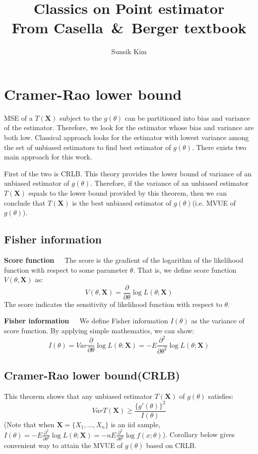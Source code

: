 \documentclass[10pt]{article}
\title{%
Classics on Point estimator \\
\large{From Casella\ \&\ Berger textbook}}
\author{Sunsik Kim}
\date{}
\begin{document}
\maketitle

\section{Cramer-Rao lower bound}
MSE of a $T(\textbf{X})$ subject to the $g(\theta)$ can be partitioned into bias and variance of the estimator. Therefore, we look for the estimator whose bias and variance are both low. Classical approach looks for the estimator with lowest variance among the set of unbiased estimators to find best estimator of $g(\theta)$. There exists two main approach for this work. 

\noindent First of the two is CRLB. This theory provides the lower bound of variance of an unbiased estimator of $g(\theta)$. Therefore, if the variance of an unbiased estimator $T(\textbf{X})$ equals to the lower bound provided  by this theorem, then we can conclude that $T(\textbf{X})$ is the best unbiased estimator of $g(\theta)$(i.e. MVUE of $g(\theta)$).

\subsection{Fisher information}
\textbf{Score function}\ \ \ The score is the gradient of the logarithm of the likelihood function with respect to some parameter $\theta$. That is, we define score function $V(\theta, \textbf{X})$ as:
$$
V(\theta, \textbf{X})=\displaystyle\frac{\partial}{\partial\theta}\log L(\theta;\textbf{X})
$$
The score indicates the sensitivity of likelihood function with respect to $\theta$.\bigskip

\noindent \textbf{Fisher information}\ \ \ We define Fisher information $I(\theta)$ as the variance of score function. By applying simple mathematics, we can show:
$$
I(\theta)=Var\displaystyle\frac{\partial}{\partial\theta}\log L(\theta;\textbf{X})=-E\displaystyle\frac{\partial^2}{\partial\theta^2}\log L(\theta;\textbf{X})
$$

\subsection{Cramer-Rao lower bound(CRLB)}
This theorem shows that any unbiased estimator $T(\textbf{X})$ of $g(\theta)$ satisfies:
$$
VarT(\textbf{X})\geq\frac{\{g'(\theta)\}^2}{I(\theta)}
$$
(Note that when $\textbf{X}=\{X_1,...,X_n\}$ is an iid sample, $I(\theta)=-E\displaystyle\frac{\partial^2}{\partial\theta^2}\log L(\theta;\textbf{X})=-nE\displaystyle\frac{\partial^2}{\partial\theta^2}\log f(x;\theta)
$). Corollary below gives convenient way to attain the MVUE of $g(\theta)$ based on CRLB.\bigskip
\end{document}
